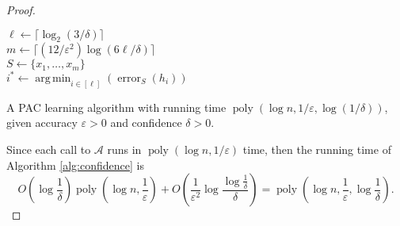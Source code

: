 \documentclass[letterpaper, reqno,11pt]{article}
\DeclareMathOperator{\poly}{poly}
\DeclareMathOperator{\argmin}{arg\,min}
\DeclareMathOperator{\error}{error}
\begin{document}
\begin{enumerate}
\begin{proof}
    \begin{algorithm}
      $\ell \leftarrow \lceil\log_2 (3/\delta) \rceil$ \\
      $m \leftarrow \lceil (12/\varepsilon^2) \log (6\ell/\delta) \rceil$ \\
      $S \leftarrow \{ x_1, \ldots, x_m \}$ \\
      $i^* \leftarrow \argmin_{i \in [\ell]}(\error_S(h_i))$ \\
      \caption{A PAC learning algorithm with running time $\poly(\log n, 1/\varepsilon, \log(1/\delta))$, given accuracy $\varepsilon > 0$ and confidence $\delta > 0$.}
      \label{alg:confidence}
    \end{algorithm}

    Since each call to $\mathcal A$ runs in $\poly(\log n, 1/\varepsilon)$ time, then the running time of Algorithm \ref{alg:confidence} is
    $$ O\left(\log \frac{1}{\delta}\right) \poly\left(\log n, \frac{1}{\varepsilon}\right) + O\left(\frac{1}{\varepsilon^2} \log \frac{\log \frac{1}{\delta}}{\delta}\right) = \poly\left(\log n, \frac{1}{\varepsilon}, \log \frac{1}{\delta}\right). $$


\end{proof}
\end{enumerate}
\end{document}

